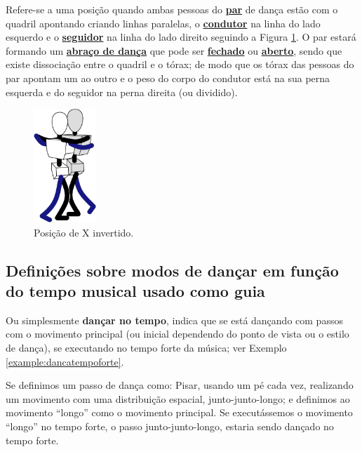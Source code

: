 \begin{definition}
\label{def:X-invertido-position} 
Refere-se a uma posição quando ambas pessoas do \hyperref[def:Par]{\textbf{par}} 
de dança estão com o quadril apontando criando linhas paralelas,
o \hyperref[def:Condutor]{\textbf{condutor}} na linha do lado esquerdo e
o \hyperref[def:Seguidor]{\textbf{seguidor}} na linha do lado direito seguindo a Figura \ref{fig:positiongeralsamba:xinvertido}.
O par estará formando um \hyperref[def:abracodedanca]{\textbf{abraço de dança}}
que pode ser \hyperref[def:closed-position]{\textbf{fechado}} 
ou \hyperref[def:open-position]{\textbf{aberto}},
sendo que existe dissociação entre o quadril e o tórax;
de modo que os tórax das pessoas do par apontam um ao outro e 
o peso do corpo do condutor está na sua perna esquerda e do seguidor na perna direita (ou dividido).
\end{definition}

\begin{figure}[!ht]
         \centering
         \includegraphics[width=0.21\textwidth]{chapters/cap-normas/position-x-inverso.eps}
         \caption{Posição de X invertido.}
         \label{fig:positiongeralsamba:xinvertido}
\end{figure}

\subsection{Definições sobre modos de dançar em função do tempo musical usado como guia}



\begin{definition} 
\label{def:DancaNoTempo}
Ou simplesmente \textbf{dançar no tempo}, indica que se está dançando com passos com o movimento principal 
(ou inicial dependendo do ponto de vista ou o estilo de dança), 
se executando no tempo forte da música; ver Exemplo \ref{example:dancatempoforte}.
\end{definition}
\begin{example}
\label{example:dancatempoforte}
Se definimos um passo de dança como: Pisar, usando um pé cada vez, 
realizando um movimento com uma distribuição espacial, junto-junto-longo;
e definimos ao movimento ``longo'' como o movimento principal. 
Se executássemos o movimento ``longo'' no tempo forte, o passo junto-junto-longo,
estaria sendo dançado no tempo forte.
\end{example}

